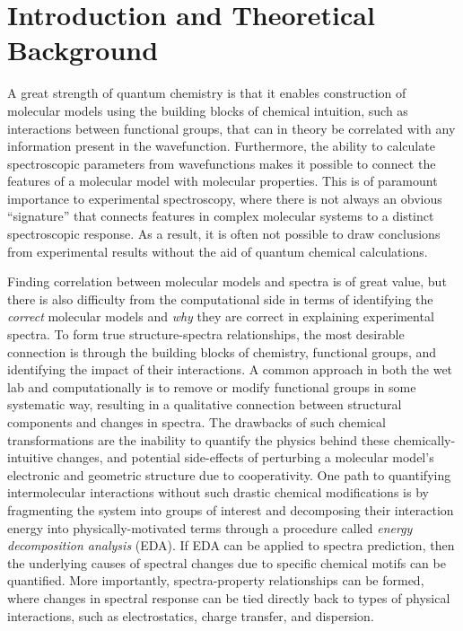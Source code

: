 \documentclass[%
class = book,%
crop = false,%
float = true,%
multi = true,%
preview = false,%
]{standalone}
\begin{document}
\onlyifstandalone{{\hypersetup{linkcolor=black}\tableofcontents{}}}
\chapter{Introduction and Theoretical Background}
\label{ch:introduction}

A great strength of quantum chemistry is that it enables construction of molecular models using the building blocks of chemical intuition, such as interactions between functional groups, that can in theory be correlated with any information present in the wavefunction. Furthermore, the ability to calculate spectroscopic parameters from wavefunctions makes it possible to connect the features of a molecular model with molecular properties. This is of paramount importance to experimental spectroscopy, where there is not always an obvious ``signature'' that connects features in complex molecular systems to a distinct spectroscopic response. As a result, it is often not possible to draw conclusions from experimental results without the aid of quantum chemical calculations.

Finding correlation between molecular models and spectra is of great value, but there is also difficulty from the computational side in terms of identifying the \emph{correct} molecular models and \emph{why} they are correct in explaining experimental spectra. To form true structure-spectra relationships, the most desirable connection is through the building blocks of chemistry, functional groups, and identifying the impact of their interactions. A common approach in both the wet lab and computationally is to remove or modify functional groups in some systematic way, resulting in a qualitative connection between structural components and changes in spectra. The drawbacks of such chemical transformations are the inability to quantify the physics behind these chemically-intuitive changes, and potential side-effects of perturbing a molecular model's electronic and geometric structure due to cooperativity. One path to quantifying intermolecular interactions without such drastic chemical modifications is by fragmenting the system into groups of interest and decomposing their interaction energy into physically-motivated terms through a procedure called \emph{energy decomposition analysis} (EDA). If EDA can be applied to spectra prediction, then the underlying causes of spectral changes due to specific chemical motifs can be quantified. More importantly, spectra-property relationships can be formed, where changes in spectral response can be tied directly back to types of physical interactions, such as electrostatics, charge transfer, and dispersion.
\end{document}
